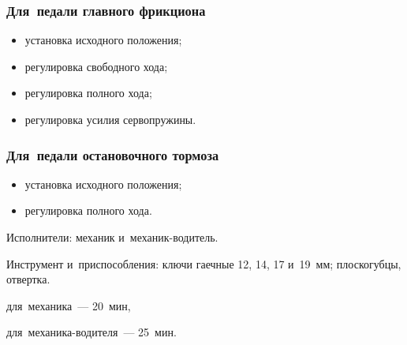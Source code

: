 
\subsubsection{Для~педали главного фрикциона}
\begin{itemize}
    \item установка исходного положения; 
    \item регулировка свободного хода; 
    \item регулировка полного хода; 
    \item регулировка усилия сервопружины.
\end{itemize}

\subsubsection{Для~педали остановочного тормоза}
\begin{itemize}
    \item установка исходного положения; 
    \item регулировка полного хода. 
\end{itemize}

\noindent
Исполнители: механик и~механик-водитель. 

\noindent
Инструмент и~приспособления: ключи гаечные 12, 14, 17 и~19~мм; плоскогубцы, отвертка. 

\begin{standarttime}
    \item для~механика~--- 20~мин,
    \item для~механика-водителя~--- 25~мин. 
\end{standarttime}

